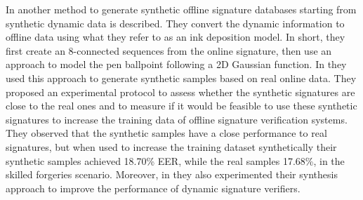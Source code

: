 In \cite{ferrer2013realistic} another method to generate synthetic offline signature databases starting from synthetic dynamic data is described. They convert the dynamic information to offline data using what they refer to as an ink deposition model. In short, they first create an 8-connected sequences from the online signature, then use an approach to model the pen ballpoint following a 2D Gaussian function. In \cite{diaz2014generation} they used this approach to generate synthetic samples based on real online data. They proposed an experimental protocol to assess whether the synthetic signatures are close to the real ones and to measure if it would be feasible to use these synthetic signatures to increase the training data of offline signature verification systems. They observed that the synthetic samples have a close performance to real signatures, but when used to increase the training dataset synthetically their synthetic samples achieved 18.70\% EER, while the real samples 17.68\%, in the skilled forgeries scenario. Moreover, in \cite{galbally2015line} they also experimented their synthesis approach to improve the performance of dynamic signature verifiers.

